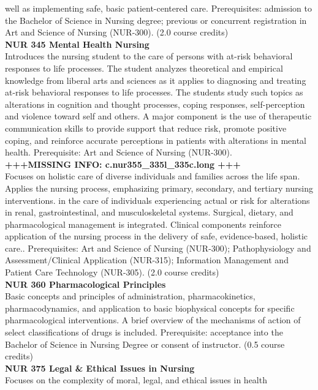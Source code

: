 \documentclass[
  letterpaper,
]{scrbook}
\begin{document}
well as implementing safe, basic patient-centered care. Prerequisites:
admission to the Bachelor of Science in Nursing degree; previous or
concurrent registration in Art and Science of Nursing (NUR-300). (2.0
course credits)\\
\textbf{NUR 345 Mental Health Nursing}\\
Introduces the nursing student to the care of persons with at-risk
behavioral responses to life processes. The student analyzes theoretical
and empirical knowledge from liberal arts and sciences as it applies to
diagnosing and treating at-risk behavioral responses to life processes.
The students study such topics as alterations in cognition and thought
processes, coping responses, self-perception and violence toward self
and others. A major component is the use of therapeutic communication
skills to provide support that reduce risk, promote positive coping, and
reinforce accurate perceptions in patients with alterations in mental
health. Prerequisite: Art and Science of Nursing (NUR-300).\\
\textbf{+++MISSING INFO: c.nur355\_335l\_335c.long +++}\\
Focuses on holistic care of diverse individuals and families across the
life span. Applies the nursing process, emphasizing primary, secondary,
and tertiary nursing interventions. in the care of individuals
experiencing actual or risk for alterations in renal, gastrointestinal,
and musculoskeletal systems. Surgical, dietary, and pharmacological
management is integrated. Clinical components reinforce application of
the nursing process in the delivery of safe, evidence-based, holistic
care.. Prerequisites: Art and Science of Nursing (NUR-300);
Pathophysiology and Assessment/Clinical Application (NUR-315);
Information Management and Patient Care Technology (NUR-305). (2.0
course credits)\\
\textbf{NUR 360 Pharmacological Principles}\\
Basic concepts and principles of administration, pharmacokinetics,
pharmacodynamics, and application to basic biophysical concepts for
specific pharmacological interventions. A brief overview of the
mechanisms of action of select classifications of drugs is included.
Prerequisite: acceptance into the Bachelor of Science in Nursing Degree
or consent of instructor. (0.5 course credits)\\
\textbf{NUR 375 Legal \& Ethical Issues in Nursing}\\
Focuses on the complexity of moral, legal, and ethical issues in health
\end{document}
